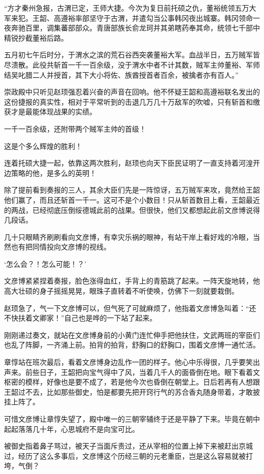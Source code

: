 “方才秦州急报，古渭已定，王师大捷。今次为复日前托硕之仇，董裕统领五万大军来犯。王韶、高遵裕率部坚守于古渭，并遣勾当公事韩冈夜出城寨。韩冈领命一夜奔驰百里，调集蕃部部众。青唐部族长俞龙珂并其弟瞎药奉其命，统领七千部中精锐抄截董裕后路。

五月初七午后时分，于渭水之滨的荒石谷西突袭董裕大军。血战半日，五万贼军皆尽溃散。此役共斩首一千一百余级，没于渭水中者不计其数，贼军主帅董裕、军师结吴叱腊二人并授首，其下大小将佐、族酋授首者百余，被擒者亦有百人。”

崇政殿中只听见赵顼强忍着兴奋的声音在回响。他不怀疑王韶和高遵裕联名发出的这份捷报的真实性，相对于平常听到的击退几万几十万敌军的吹嘘，只有斩首和缴获才是最能体现战果的实绩。

一千一百余级，还附带两个贼军主帅的首级！

这是个多么辉煌的胜利！

连着托硕大捷一起，依靠这两次胜利，赵顼也向天下臣民证明了一直支持着河湟开边策略的他，是多么的英明！

除了提前看到奏报的三人，其余大臣们先是一阵惊讶，五万贼军来攻，竟然给王韶他们赢了，而且还斩首一千一。这可不是个小数目！只从斩首数目上看，王韶最近的两战，已经彻底压倒绥德城此前的战果。但很快，他们又都想起此前文彦博说得几段话。

几十只眼睛齐刷刷看向文彦博，有幸灾乐祸的眼神，有站干岸上看好戏的冷眼，当然也有把同情投向文彦博的视线。

‘怎么会？！怎么可能！？’

文彦博紧紧捏着奏报，脸色涨得血红，手背上的青筋跳了起来。一阵天旋地转，他高大壮硕的身子摇摇晃晃，眼珠子直转着不听使唤，仿佛下一刻就要栽倒。

赵顼急了，气一下文彦博可以，但气死了可就麻烦了，他指着文彦博急叫着：“还不快扶着文卿家！”自己也是哗的一下站了起来。

刚刚递过奏文，就站在文彦博身前的小黄门连忙伸手把他扶住，文武两班的宰臣们也乱了阵脚，一齐涌上前。拍背的拍背，舒胸口的舒胸口，围着文彦博一通忙活。

章惇站在班次最后，看着文彦博身边乱作一团的样子。他心中乐得很，几乎要笑出声来。前些日子，王韶把向宝气得中了风，当着几千人的面昏倒在地。眼下看着文枢密的模样，好像也是要不成了，若是他今次也昏倒在朝堂上。日后若再有人想跟王韶过不去，比如那些御史，怕是都要先把开窍行气的苏合香丸随身带着，才敢披挂上阵了。

可惜文彦博让章惇失望了，殿中唯一的三朝宰辅终于还是平静了下来。毕竟在朝中起起落落几十年，心思城府不是向宝可比。

被御史指着鼻子骂过，被天子当面斥责过，还从宰相的位置上掉下来被赶出京城过，经历了这么多事后，文彦博这个历经三朝的元老重臣，岂是这么容易就被打垮，气倒？

